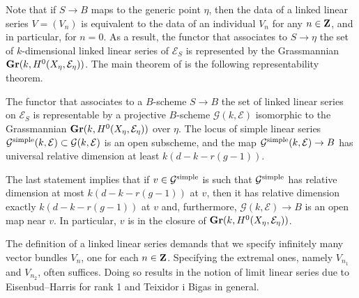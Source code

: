 Note that if $S \to B$ maps to the generic point $\eta$, then the data of a linked linear series $V = (V_n)$ is equivalent to the data of an individual $V_n$ for any $n \in {\bf Z}$, and in particular, for $n = 0$.
As a result, the functor that associates to $S \to \eta$ the set of $k$-dimensional linked linear series of $\mathcal E_S$ is represented by the Grassmannian ${\bf Gr}(k, H^0(X_\eta, \mathcal E_\eta))$.
The main theorem of \cite{oss:14} is the following representability theorem.
\begin{theorem}
  \label{thm:lls}
  The functor that associates to a $B$-scheme $S \to B$ the set of linked linear series on $\mathcal E_S$ is representable by a projective $B$-scheme $\mathcal G(k, \mathcal E)$ isomorphic to the Grassmannian ${\bf Gr}(k, H^0(X_\eta, \mathcal E_\eta))$ over $\eta$.
  The locus of simple linear series ${\mathcal G}^{\rm simple}(k, \mathcal E) \subset {\mathcal G}(k, \mathcal E)$ is an open subscheme, and the map ${\mathcal G}^{\rm simple}(k, \mathcal E) \to B$ has universal relative dimension at least $k(d-k-r(g-1))$.
\end{theorem}
The last statement implies that if $v \in {\mathcal G}^{\rm simple}$ is such that ${\mathcal G}^{\rm simple}$ has relative dimension at most $k(d-k-r(g-1))$ at $v$, then it has relative dimension exactly $k(d-k-r(g-1))$ at $v$ and, furthermore, $\mathcal G(k, \mathcal E) \to B$ is an open map near $v$.
In particular, $v$ is in the closure of ${\bf Gr}(k, H^0(X_\eta, \mathcal E_\eta))$.

The definition of a linked linear series demands that we specify infinitely many vector bundles $V_n$, one for each $n \in {\bf Z}$.
Specifying the extremal ones, namely $V_{n_1}$ and $V_{n_2}$, often suffices.
Doing so results in the notion of limit linear series due to Eisenbud--Harris \cite{eis.har:86,eis.har:84} for rank 1 and Teixidor i Bigas \cite{tei-i-big:91} in general.

